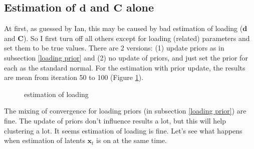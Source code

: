\documentclass[]{article}
\begin{document}
\subsection{Estimation of \(\mathbf{d}\) and \(\mathbf{C}\) alone}
At first, as guessed by Ian, this may be caused by bad estimation of loading (\(\mathbf{d}\) and \(\mathbf{C}\)). So I first turn off all others except for loading (related) parameters and set them to be true values. There are 2 versions: (1) update priors as in subsection \ref{loading prior} and (2) no update of priors, and just set the prior for each as the standard normal.
For the estimation with prior update, the results are mean from iteration 50 to 100 (Figure \ref{loading alone}).
\begin{figure}[h!]
	\caption{estimation of loading}
	\label{loading alone}
\end{figure}
 
The mixing of convergence for loading priors (in subsection \ref{loading prior}) are fine. The update of priors don't influence results a lot, but this will help clustering a lot. It seems estimation of loading is fine. Let's see what happens when estimation of latents \(\mathbf{x}_t\) is on at the same time.
\end{document}
